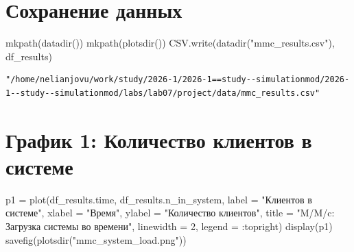 \documentclass[
  12pt,
  a4paper,
  DIV=11,
  numbers=noendperiod]{scrreprt}
\newenvironment{Shaded}{\begin{snugshade}}{\end{snugshade}}
\newcommand{\FloatTok}[1]{\textcolor[rgb]{0.68,0.00,0.00}{#1}}
\newcommand{\FunctionTok}[1]{\textcolor[rgb]{0.28,0.35,0.67}{#1}}
\newcommand{\NormalTok}[1]{\textcolor[rgb]{0.00,0.23,0.31}{#1}}
\newcommand{\OperatorTok}[1]{\textcolor[rgb]{0.37,0.37,0.37}{#1}}
\newcommand{\StringTok}[1]{\textcolor[rgb]{0.13,0.47,0.30}{#1}}
\begin{document}
\section{Сохранение
данных}\label{ux441ux43eux445ux440ux430ux43dux435ux43dux438ux435-ux434ux430ux43dux43dux44bux445}

\begin{Shaded}
\begin{Highlighting}[]
\FunctionTok{mkpath}\NormalTok{(}\FunctionTok{datadir}\NormalTok{())}
\FunctionTok{mkpath}\NormalTok{(}\FunctionTok{plotsdir}\NormalTok{())}
\NormalTok{CSV.}\FunctionTok{write}\NormalTok{(}\FunctionTok{datadir}\NormalTok{(}\StringTok{"mmc\_results.csv"}\NormalTok{), df\_results)}
\end{Highlighting}
\end{Shaded}

\begin{verbatim}
"/home/nelianjovu/work/study/2026-1/2026-1==study--simulationmod/2026-1--study--simulationmod/labs/lab07/project/data/mmc_results.csv"
\end{verbatim}

\section{График 1: Количество клиентов в
системе}\label{ux433ux440ux430ux444ux438ux43a-1-ux43aux43eux43bux438ux447ux435ux441ux442ux432ux43e-ux43aux43bux438ux435ux43dux442ux43eux432-ux432-ux441ux438ux441ux442ux435ux43cux435}

\begin{Shaded}
\begin{Highlighting}[]
\NormalTok{p1 }\OperatorTok{=} \FunctionTok{plot}\NormalTok{(df\_results.time, df\_results.n\_in\_system,}
\NormalTok{    label }\OperatorTok{=} \StringTok{"Клиентов в системе"}\NormalTok{,}
\NormalTok{    xlabel }\OperatorTok{=} \StringTok{"Время"}\NormalTok{,}
\NormalTok{    ylabel }\OperatorTok{=} \StringTok{"Количество клиентов"}\NormalTok{,}
\NormalTok{    title }\OperatorTok{=} \StringTok{"M/M/c: Загрузка системы во времени"}\NormalTok{,}
\NormalTok{    linewidth }\OperatorTok{=} \FloatTok{2}\NormalTok{,}
\NormalTok{    legend }\OperatorTok{=} \OperatorTok{:}\NormalTok{topright)}
\FunctionTok{display}\NormalTok{(p1)}
\FunctionTok{savefig}\NormalTok{(}\FunctionTok{plotsdir}\NormalTok{(}\StringTok{"mmc\_system\_load.png"}\NormalTok{))}
\end{Highlighting}
\end{Shaded}
\end{document}
